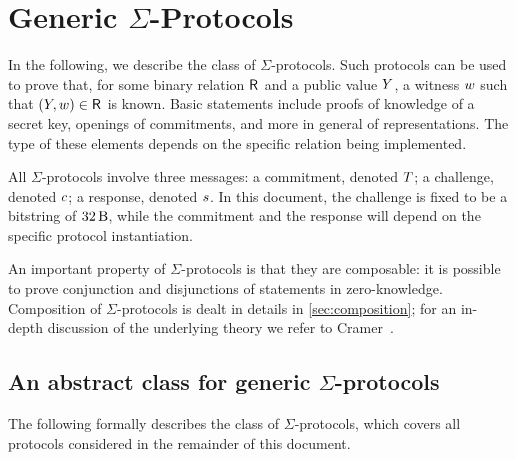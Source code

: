 \documentclass[11pt]{article}
\begin{document}
\section{Generic $\Sigma$-Protocols}
In the following, we describe the class of $\Sigma$-protocols.
Such protocols can be used to prove that, for some binary relation ${\mathsf{R}_{\operatorname{{}}}}$ and a public value $Y$, a witness $w$ such that $(Y,w)\in{\mathsf{R}_{\operatorname{{}}}}$ is known.
Basic statements include proofs of knowledge of a secret key, openings of commitments, and more in general of representations.
The type of these elements depends on the specific relation being implemented.

All $\Sigma$-protocols involve three messages: a commitment, denoted $T$; a challenge, denoted $c$; a response, denoted $s$.
In this document, the challenge is fixed to be a bitstring of $\seedlen$,
while the commitment and the response will depend on the specific protocol instantiation.

An important property of $\Sigma$-protocols is that they are composable: it is possible to prove conjunction and disjunctions of statements in zero-knowledge.
Composition of $\Sigma$-protocols is dealt in details in \cref{sec:composition}; for an in-depth discussion of the underlying theory we refer to Cramer~\cite{cramer97}.

\subsection{An abstract class for generic $\Sigma$-protocols}
The following formally describes the class of $\Sigma$-protocols, which covers all protocols considered in the remainder of this document.
\end{document}
